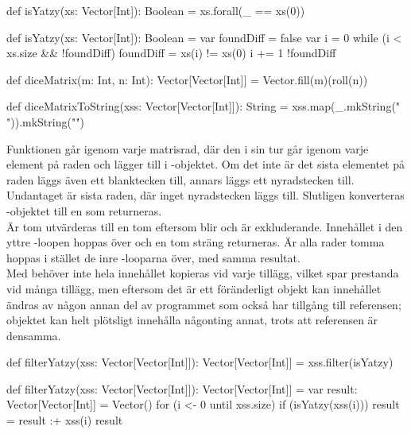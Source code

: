 \SubtaskSolved  \begin{Code}
def isYatzy(xs: Vector[Int]): Boolean = xs.forall(_ == xs(0))
\end{Code}

\SubtaskSolved  \begin{Code}
def isYatzy(xs: Vector[Int]): Boolean = {
	var foundDiff = false
	var i = 0
	while (i < xs.size && !foundDiff) {
		foundDiff = xs(i) != xs(0)
		i += 1
	}
	!foundDiff
}
\end{Code}

\SubtaskSolved  \begin{Code}
def diceMatrix(m: Int, n: Int): Vector[Vector[Int]] =
  Vector.fill(m)(roll(n))
\end{Code}

\SubtaskSolved  \begin{Code}
def diceMatrixToString(xss: Vector[Vector[Int]]): String =
  xss.map(_.mkString(" ")).mkString("\n")
\end{Code}

\SubtaskSolved  Funktionen går igenom varje matrisrad, där den i sin tur går igenom
varje element på raden och lägger till i -objektet. Om det inte är
det sista elementet på raden läggs även ett blanktecken till, annars läggs ett
nyradstecken till. Undantaget är sista raden, där inget nyradstecken läggs till.
Slutligen konverteras -objektet till en  som
returneras.\\
Är  tom utvärderas  till en tom 
eftersom  blir  och  är exkluderande.
Innehållet i den yttre -loopen hoppas över och en tom sträng returneras.
Är alla rader tomma hoppas i stället de inre -looparna över, med samma resultat.\\
Med  behöver inte hela innehållet kopieras vid varje tillägg,
vilket spar prestanda vid många tillägg,
men eftersom det är ett föränderligt objekt kan innehållet ändras av någon annan
del av programmet som också har tillgång till referensen; objektet kan helt plötsligt
 innehålla någonting annat, trots att referensen är densamma.

\SubtaskSolved  \begin{Code}
def filterYatzy(xss: Vector[Vector[Int]]): Vector[Vector[Int]] =
  xss.filter(isYatzy)
\end{Code}

\SubtaskSolved  \begin{CodeSmall}
def filterYatzy(xss: Vector[Vector[Int]]): Vector[Vector[Int]] = {
	var result: Vector[Vector[Int]] = Vector()
	for (i <- 0 until xss.size) {
		if (isYatzy(xss(i))) result = result :+ xss(i)
	}
	result
}
\end{CodeSmall}

